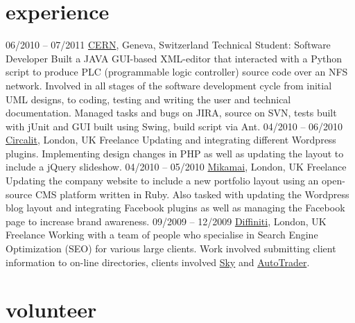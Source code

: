\documentclass[]{friggeri-cv}
\begin{document}
\section{experience}

\begin{entrylist}
  \entry
    {06/2010 – 07/2011}
    {\href{http://cern.ch}{CERN}, Geneva, Switzerland}
    {Technical Student: Software Developer}
    {Built a JAVA GUI-based XML-editor that interacted with a Python script to produce PLC (programmable logic controller) source code over an NFS network. Involved in all stages of the software development cycle from initial UML designs, to coding, testing and writing the user and technical documentation. Managed tasks and bugs on JIRA, source on SVN, tests built with jUnit and GUI built using Swing, build script via Ant.}
  \entry
    {04/2010 – 06/2010}
    {\href{http://www.circalit.com}{Circalit}, London, UK}
    {Freelance}
    {Updating and integrating different Wordpress plugins. Implementing design changes in PHP as well as updating the layout to include a jQuery slideshow.}
  \entry
    {04/2010 – 05/2010}
    {\href{http://mikamai.com}{Mikamai}, London, UK}
    {Freelance}
    {Updating the company website to include a new portfolio layout using an open-source CMS platform written in Ruby. Also tasked with updating the Wordpress blog layout and integrating Facebook plugins as well as managing the Facebook page to increase brand awareness.}
  \entry
    {09/2009 – 12/2009}
    {\href{http://www.diffiniti.com}{Diffiniti}, London, UK}
    {Freelance}
    {Working with a team of people who specialise in Search Engine Optimization (SEO) for various large clients. Work involved submitting client information to on-line directories, clients involved \href{http://www.sky.com}{Sky} and \href{http://www.autotrader.com}{AutoTrader}.}
\end{entrylist}

\section{volunteer}
\end{document}
